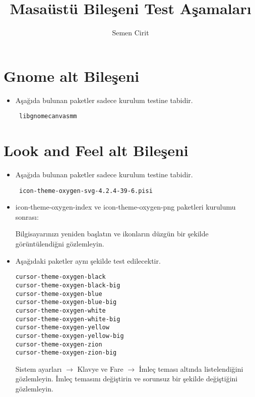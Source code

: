 \documentclass[a4paper,10pt]{article}
\title{Masaüstü Bileşeni Test Aşamaları}
\author{Semen Cirit}
\begin{document}
\maketitle
\section{Gnome alt Bileşeni}
\begin{itemize}
 \item Aşağıda bulunan paketler sadece kurulum testine tabidir.
\begin{verbatim}
 libgnomecanvasmm
\end{verbatim}

\end{itemize}

\section{Look and Feel alt Bileşeni}
\begin{itemize}
\item Aşağıda bulunan paketler sadece kurulum testine tabidir.
\begin{verbatim}
 icon-theme-oxygen-svg-4.2.4-39-6.pisi
\end{verbatim}
\item icon-theme-oxygen-index ve icon-theme-oxygen-png paketleri kurulumu sonrası:

Bilgisayarınızı yeniden başlatın ve ikonların düzgün bir şekilde görüntülendiğni gözlemleyin.
 \item Aşağıdaki paketler aynı şekilde test edilecektir.
\begin{verbatim}
cursor-theme-oxygen-black
cursor-theme-oxygen-black-big
cursor-theme-oxygen-blue
cursor-theme-oxygen-blue-big
cursor-theme-oxygen-white
cursor-theme-oxygen-white-big
cursor-theme-oxygen-yellow
cursor-theme-oxygen-yellow-big
cursor-theme-oxygen-zion
cursor-theme-oxygen-zion-big
\end{verbatim}

Sistem ayarları $\rightarrow$  Klavye ve Fare $\rightarrow$ İmleç teması altında listelendiğini gözlemleyin. İmleç temasını değiştirin ve sorunsuz bir şekilde değiştiğini gözlemleyin.

\end{itemize}
\end{document}
